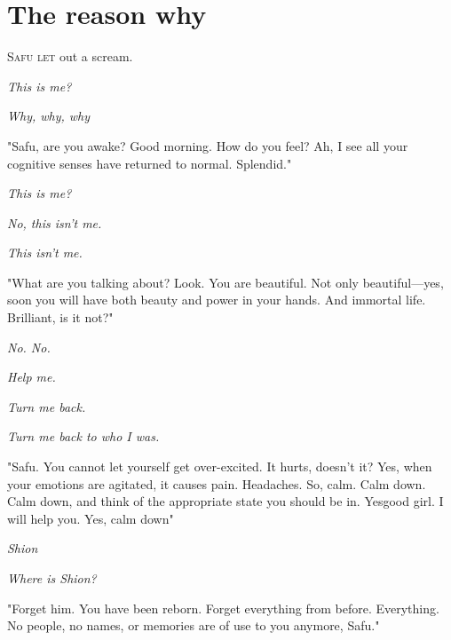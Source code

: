 
\chapter{The reason why}


\lettrine{S}{afu let} out a scream.

\emph{This is me?}

\emph{Why, why, why\el }

"Safu, are you awake? Good morning. How do you feel? Ah, I see all your
cognitive senses have returned to normal. Splendid."

\emph{This is me?}

\emph{No, this isn't me.}

\emph{This isn't me.}

"What are you talking about? Look. You are beautiful. Not only
beautiful---yes, soon you will have both beauty and power in your hands.
And immortal life. Brilliant, is it not?"

\emph{No. No.}

\emph{Help me.}

\emph{Turn me back.}

\emph{Turn me back to who I was.}

"Safu. You cannot let yourself get over-excited. It hurts, doesn't it?
Yes, when your emotions are agitated, it causes pain. Headaches. So,
calm. Calm down. Calm down, and think of the appropriate state you
should be in. Yes\el good girl. I will help you. Yes, calm down\el "

\emph{Shion\el }

\emph{Where is Shion?}

"Forget him. You have been reborn. Forget everything from before.
Everything. No people, no names, or memories are of use to you anymore,
Safu."

